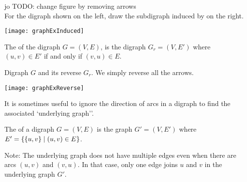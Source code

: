 \begin{Boxample}
jo TODO: change figure by removing arrows \\
For the digraph shown on the left, draw the subdigraph induced by   on the right.
\begin{center}
\texttt{[image: graphExInduced]}
\end{center}
\end{Boxample}



\begin{Definition}
The  of the digraph $G = (V, E)$, is the digraph $G_r = (V, E')$ where $(u, v)\in E'$ if and only if $(v, u)\in E$.
\end{Definition}

\begin{samepage}
\begin{Example}
Digraph $G$ and its reverse $G_r$. We simply reverse all the arrows.
\begin{center}
\texttt{[image: graphExReverse]}
\end{center}
\end{Example}
\end{samepage}

It is sometimes useful to ignore the direction of arcs in a digraph to find the associated `underlying graph''.

\begin{Definition}
The  of a digraph $G = (V, E)$ is the graph 
$G' = (V, E')$ where $E' = \mbox{$\{\{u, v\} \mid (u, v)\in E\}$}$.
\end{Definition}


Note: The underlying graph does not have multiple edges even when there are arcs $(u, v)$ and $(v, u)$. 
In that case, only one edge joins $u$ and $v$ in the underlying graph $G'$.  

